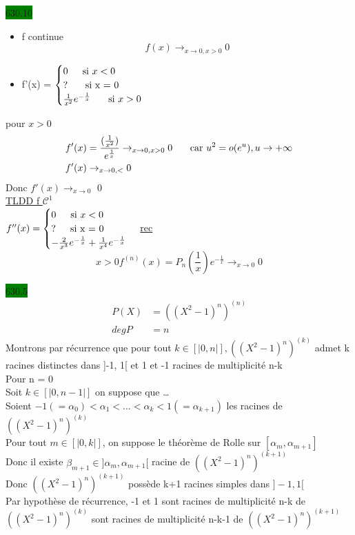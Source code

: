 \documentclass{article}
\begin{document}
\noindent \colorbox{green}{630.10}\\
\begin{itemize}
    \item f continue \begin{equation*}
        f(x) \rightarrow_{x\to 0, x>0} 0
    \end{equation*}
    \item f'(x) = \(\begin{cases}
        0 \indent \text{si } x < 0\\
        ? \indent \text{ si x = 0}\\
        \frac{1}{x^2}e^{-\frac{1}{x}} \indent \text{ si } x > 0
    \end{cases}\)
\end{itemize}
pour \(x > 0\) \begin{align*}
    f'(x) &= \frac{(\frac{1}{x^2})}{e^{\frac{1}{x}}} \rightarrow_{x\to 0, x>0} 0 \indent \text{ car } u^2 = o(e^u), u\to +\infty\\
    f'(x) &\rightarrow_{x\to 0, <} 0
\end{align*}
Donc \(f'(x) \rightarrow_{x\to 0}\) 0\\
\underline{TLDD f \(\mathcal{C}^1\)}\\
\begin{math}
    f''(x) = \begin{cases}
        0 \indent \text{si } x < 0\\
        ? \indent\text{si x = 0}\\
        -\frac{2}{x^3}e^{-\frac{1}{x}} + \frac{1}{x^4}e^{-\frac{1}{x}}
    \end{cases}
\end{math}
\underline{rec} 
\begin{equation*}
    x>0 f^{(n)}(x) = P_n(\frac{1}{x})e^{-\frac{1}{x}} \rightarrow_{x \to 0} 0
\end{equation*}

\noindent \colorbox{green}{630.5}\\
\begin{align*}
    P(X) &= ((X^2-1)^n)^{(n)}\\
    degP &= n
\end{align*}
Montrons par récurrence que pour tout \(k \in [|0, n|], ((X^2-1)^n)^{(k)}\)
admet k racines distinctes dans ]-1, 1[ et 
1 et -1 racines de multiplicité n-k\\
Pour n = 0 \\
Soit \(k \in [|0, n-1|]\) on suppose que \dots\\
Soient \(-1 (=\alpha_0) < \alpha_1 <\dots<\alpha_{k}<1(=\alpha_{k+1})\) les racines de \(((X^2-1)^n)^{(k)}\)\\
Pour tout \(m \in [|0,k|]\), on suppose le théorème de Rolle sur \([\alpha_m, \alpha_{m+1}]\)\\
Donc il existe \(\beta_{m+1}\in ]\alpha_m, \alpha_{m+1}[\) racine de \(((X^2-1)^n)^{(k+1)}\)\\
Donc \(((X^2-1)^n)^{(k+1)}\) possède k+1 racines simples dans \(]-1, 1[\)\\
Par hypothèse de récurrence, -1 et 1 sont racines de multiplicité n-k de \(((X^2-1)^n)^{(k)}\)
sont racines de multiplicité n-k-1 de \(((X^2-1)^n)^{(k+1)}\)\\
\end{document}
